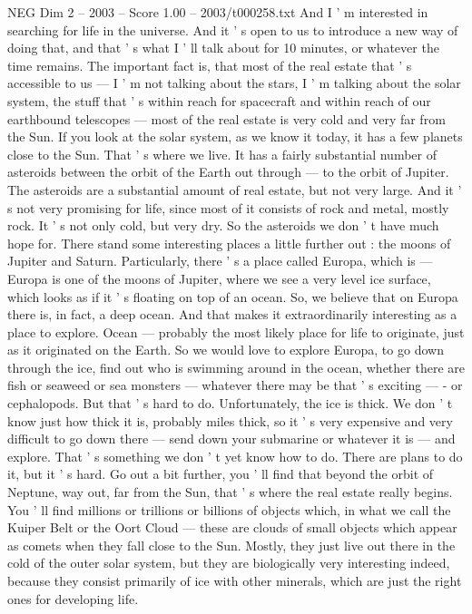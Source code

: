 \begin{textsample}{NEG Dim 2 – 2003 – Score 1.00 – 2003/t000258.txt}
And I ' m interested in searching for life in the universe.
And it ' s open to us to introduce a new way of doing that, and that ' s what I ' ll talk about for 10 minutes, or whatever the time remains.
The important fact is, that most of the real estate that ' s accessible to us — I ' m not talking about the stars, I ' m talking about the solar system, the stuff that ' s within reach for spacecraft and within reach of our earthbound telescopes — most of the real estate is very cold and very far from the Sun.
If you look at the solar system, as we know it today, it has a few planets close to the Sun.
That ' s where we live.
It has a fairly substantial number of asteroids between the orbit of the Earth out through — to the orbit of Jupiter.
The asteroids are a substantial amount of real estate, but not very large.
And it ' s not very promising for life, since most of it consists of rock and metal, mostly rock.
It ' s not only cold, but very dry.
So the asteroids we don ' t have much hope for.
There stand some interesting places a little further out : the moons of Jupiter and Saturn.
Particularly, there ' s a place called Europa, which is — Europa is one of the moons of Jupiter, where we see a very level ice surface, which looks as if it ' s floating on top of an ocean.
So, we believe that on Europa there is, in fact, a deep ocean.
And that makes it extraordinarily interesting as a place to explore.
Ocean — probably the most likely place for life to originate, just as it originated on the Earth.
So we would love to explore Europa, to go down through the ice, find out who is swimming around in the ocean, whether there are fish or seaweed or sea monsters — whatever there may be that ' s exciting — - or cephalopods.
But that ' s hard to do.
Unfortunately, the ice is thick.
We don ' t know just how thick it is, probably miles thick, so it ' s very expensive and very difficult to go down there — send down your submarine or whatever it is — and explore.
That ' s something we don ' t yet know how to do.
There are plans to do it, but it ' s hard.
Go out a bit further, you ' ll find that beyond the orbit of Neptune, way out, far from the Sun, that ' s where the real estate really begins.
You ' ll find millions or trillions or billions of objects which, in what we call the Kuiper Belt or the Oort Cloud — these are clouds of small objects which appear as comets when they fall close to the Sun.
Mostly, they just live out there in the cold of the outer solar system, but they are biologically very interesting indeed, because they consist primarily of ice with other minerals, which are just the right ones for developing life.

\end{textsample}
